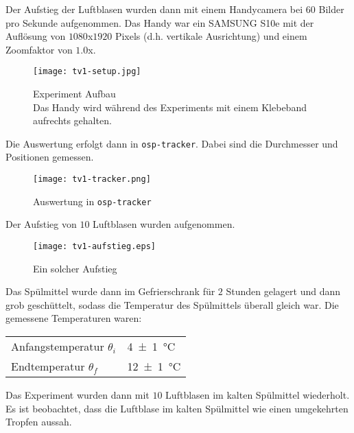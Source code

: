 \begin{enumerate}
				Der Aufstieg der Luftblasen wurden dann mit einem Handycamera bei $60$ Bilder pro Sekunde aufgenommen. Das Handy war ein SAMSUNG S10e mit der Auflösung von $1080$x$1920$ Pixels (d.h. vertikale Ausrichtung) und einem Zoomfaktor von $1.0$x. 
				\begin{figure}[H]
					\centering
					\captionsetup{width=0.8\linewidth, justification=centering}
					\texttt{[image: tv1-setup.jpg]}
					\caption{Experiment Aufbau\\Das Handy wird während des Experiments mit einem Klebeband aufrechts gehalten.}
					\vspace{-1em}
					\label{fig:exp-setup}
				\end{figure}
				Die Auswertung erfolgt dann in \texttt{osp-tracker}. Dabei sind die Durchmesser und Positionen gemessen.
				\begin{figure}[H]
					\centering
					\captionsetup{width=0.8\linewidth, justification=centering}
					\texttt{[image: tv1-tracker.png]}
					\caption{Auswertung in \texttt{osp-tracker}}
				\end{figure}
				Der Aufstieg von $10$ Luftblasen wurden aufgenommen. 
				\begin{figure}[H]
					\centering
					\captionsetup{width=0.8\linewidth, justification=centering}
					\texttt{[image: tv1-aufstieg.eps]}
					\caption{Ein solcher Aufstieg}
				\end{figure}
				\begin{multicols}{2}
					Das Spülmittel wurde dann im Gefrierschrank für $2$ Stunden gelagert und dann grob geschüttelt, sodass die Temperatur des Spülmittels überall gleich war. Die gemessene Temperaturen waren:
					\begin{center}
						\begin{tabular}{ll}
							\toprule
							Anfangstemperatur $\theta_i$ & \SI{4(1)}{\celsius} \\
							Endtemperatur $\theta_{\!f}$ & \SI{12(1)}{\celsius} \\
							\bottomrule
						\end{tabular}
					\end{center}
					Das Experiment wurden dann mit $10$ Luftblasen im kalten Spülmittel wiederholt. Es ist beobachtet, dass die Luftblase im kalten Spülmittel wie einen umgekehrten Tropfen aussah.
					\columnbreak
					\begin{figure}[H]
						\centering
						\captionsetup{width=0.45\linewidth, justification=centering}

\end{figure}
\end{multicols}
\end{enumerate}
